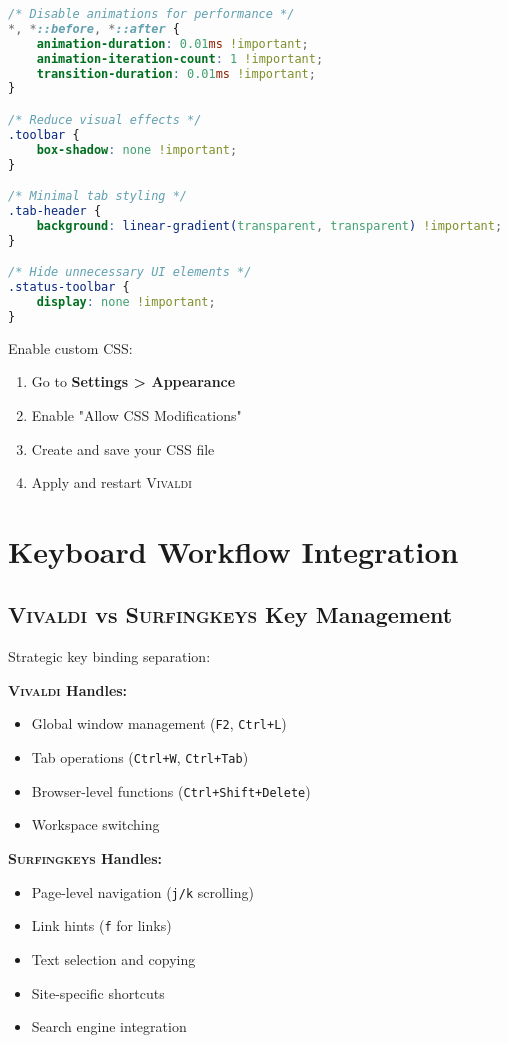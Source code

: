 \documentclass[11pt,a4paper,oneside]{book}
\newcommand{\vivaldi}{\textsc{Vivaldi}}
\newcommand{\surfingkeys}{\textsc{Surfingkeys}}
\newcommand{\menupath}[1]{\textbf{\color{darkgray}#1}}
\newcommand{\keystroke}[1]{\texttt{\color{primaryblue}#1}}
\begin{document}
\begin{codebox}
\begin{lstlisting}[language=css]
/* Disable animations for performance */
*, *::before, *::after {
    animation-duration: 0.01ms !important;
    animation-iteration-count: 1 !important;
    transition-duration: 0.01ms !important;
}

/* Reduce visual effects */
.toolbar {
    box-shadow: none !important;
}

/* Minimal tab styling */
.tab-header {
    background: linear-gradient(transparent, transparent) !important;
}

/* Hide unnecessary UI elements */
.status-toolbar {
    display: none !important;
}
\end{lstlisting}
\end{codebox}

Enable custom CSS:
\begin{enumerate}
    \item Go to \menupath{Settings > Appearance}
    \item Enable "Allow CSS Modifications"
    \item Create and save your CSS file
    \item Apply and restart \vivaldi{}
\end{enumerate}

\section{Keyboard Workflow Integration}

\subsection{\vivaldi{} vs \surfingkeys{} Key Management}

Strategic key binding separation:

\textbf{\vivaldi{} Handles:}
\begin{itemize}
    \item Global window management (\keystroke{F2}, \keystroke{Ctrl+L})
    \item Tab operations (\keystroke{Ctrl+W}, \keystroke{Ctrl+Tab})
    \item Browser-level functions (\keystroke{Ctrl+Shift+Delete})
    \item Workspace switching
\end{itemize}

\textbf{\surfingkeys{} Handles:}
\begin{itemize}
    \item Page-level navigation (\keystroke{j/k} scrolling)
    \item Link hints (\keystroke{f} for links)
    \item Text selection and copying
    \item Site-specific shortcuts
    \item Search engine integration
\end{itemize}
\end{document}
